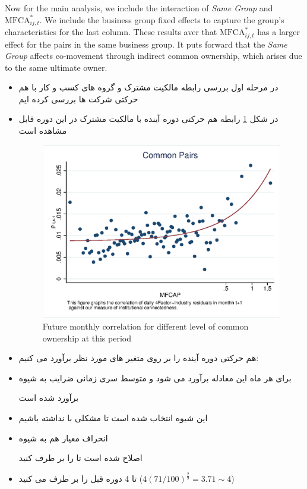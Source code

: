 \begin{LTR}
	
	Now for the main analysis, we include the interaction of \textit{Same Group} and $\text{MFCA}^*_{ij,t}$. We include the business group fixed effects to capture the group's characteristics for the last column. These results aver that $\text{MFCA}^*_{ij,t}$ has a larger effect for the pairs in the same business group. It puts forward that the \textit{Same Group}  affects co-movement through indirect common ownership, which arises due to the same ultimate owner. 
	
	
	
\end{LTR}
\begin{itemize}
	\item 
	در مرحله اول بررسی رابطه مالکیت مشترک و گروه های کسب و کار با هم حرکتی شرکت ها بررسی کرده ایم
	\item 
	در شکل 
	\ref{mcorr50}
	رابطه هم حرکتی دوره آینده با مالکیت مشترک در این دوره قابل مشاهده است
	\begin{figure}[htbp]
		\centering  
		\centering
		\includegraphics[width=0.7\linewidth]{"Output/mcorr50.eps"} 
		\caption{Future monthly correlation for different level of common ownership at this period }
		\label{mcorr50}
	\end{figure}
	\item 
	هم حرکتی دوره آینده را بر روی متغیر های مورد نظر برآورد می کنیم:
	
	
	\item
	برای هر ماه این معادله برآورد می شود و متوسط سری زمانی ضرایب به شیوه
	
	برآورد شده است
	\item
	این شیوه انتخاب شده است تا مشکلی با 
	نداشته باشیم
	\item
	انحراف معیار هم به شیوه
	
	اصلاح شده است تا 
	را بر طرف کنید
	\item
	تا 4 دوره قبل را بر طرف می کنید
	($ 4(71/100)^{\frac{2}{9}} = 3.71 \sim 4 $)
	
	
\end{itemize}

